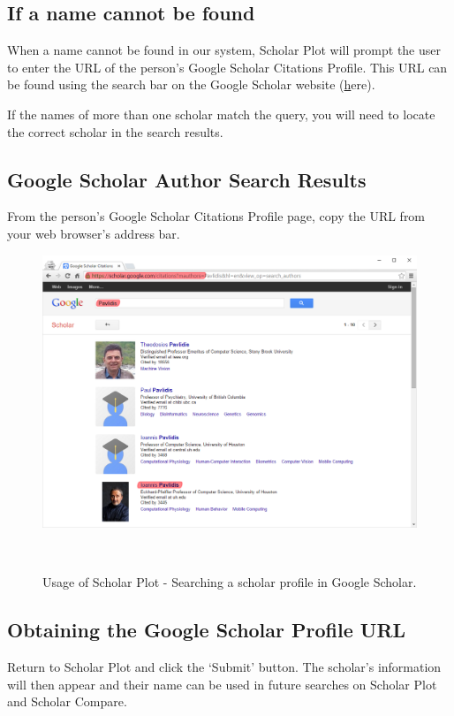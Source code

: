 \subsection{If a name cannot be found}
When a name cannot be found in our system, Scholar Plot will prompt the user to enter the URL of the person's Google Scholar Citations Profile. This URL can be found using the search bar on the Google Scholar website (\href{https://scholar.google.com/citations?mauthors=&hl=en&view_op=search_authors}here).

If the names of more than one scholar match the query, you will need to locate the correct scholar in the search results.



\subsection{Google Scholar Author Search Results}
From the person's Google Scholar Citations Profile page, copy the URL from your web browser's address bar.

\begin{figure}
  \centering
  \includegraphics[width=1\textwidth]{figures/Support-1}
  \caption{Usage of Scholar Plot - Searching a scholar profile in Google Scholar.}~\label{fig:Support-1}
\end{figure}




\subsection{Obtaining the Google Scholar Profile URL}
Return to Scholar Plot and click the `Submit' button. The scholar's information will then appear and their name can be used in future searches on Scholar Plot and Scholar Compare.

